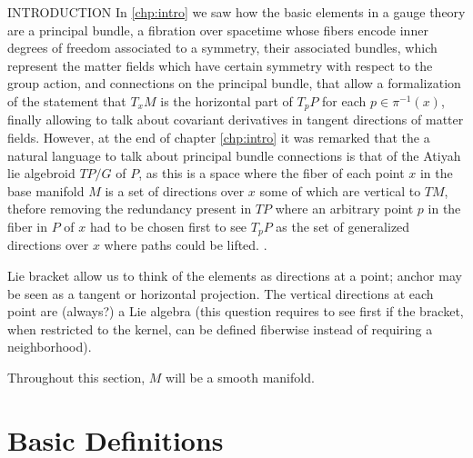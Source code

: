 INTRODUCTION  In \ref{chp:intro} we saw how the basic elements in a gauge theory are a principal bundle, a fibration over spacetime whose fibers encode inner degrees of freedom associated to a symmetry, their associated bundles, which represent the matter fields which have certain symmetry with respect to the group action, and connections on the principal bundle, that allow a formalization of the statement that $T_x M$ is the horizontal part of $T_p P$ for each $p \in \pi^{-1}(x)$, finally allowing to talk about covariant derivatives in tangent directions of matter fields. However, at the end of chapter \ref{chp:intro} it was remarked that the a natural language to talk about principal bundle connections is that of the Atiyah lie algebroid $TP/G$ of $P$, as this is a space where the fiber of each point $x$ in the base manifold $M$ is a set of directions over $x$ some of which are vertical to $TM$, thefore removing the redundancy present in $TP$ where an arbitrary point $p$ in the fiber in $P$ of $x$ had to be chosen first to see $T_p P$ as the set of generalized directions over $x$ where paths could be lifted. . 

Lie bracket allow us to think of the elements as directions at a point; anchor may be seen as a tangent or horizontal projection. The vertical directions at each point are (always?) a Lie algebra (this question requires to see first if the bracket, when restricted to the kernel, can be defined fiberwise instead of requiring a neighborhood).

Throughout this section, $M$ will be a smooth manifold.

\section{Basic Definitions}

